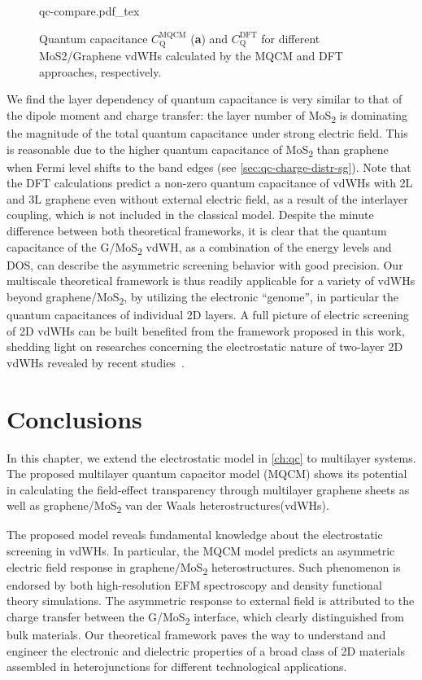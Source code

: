 \begin{figure}[!htbp]
  {qc-compare.pdf_tex}
  \caption{\label{fig:asym-qc} %
    Quantum capacitance $C_{\mathrm{Q}}^{\mathrm{MQCM}}$ (\textbf{a}) and $C_{\mathrm{Q}}^{\mathrm{DFT}}$ for different MoS2/Graphene
    vdWHs calculated by the MQCM and DFT approaches, respectively.
  }
\end{figure}
%
We find the layer dependency of quantum capacitance is very
similar to that of the dipole moment and charge transfer: the layer
number of MoS\textsubscript{2} is dominating the magnitude of the
total quantum capacitance under strong electric field. This is
reasonable due to the higher quantum capacitance of
MoS\textsubscript{2} than graphene when Fermi level shifts to the band
edges (see \autoref{sec:qc-charge-distr-sg}).
%
Note that the DFT calculations predict a non-zero quantum capacitance
of vdWHs with 2L and 3L graphene even without external electric field,
as a result of the interlayer coupling, which is not included in the
classical model. Despite the minute difference between both
theoretical frameworks, it is clear that the quantum capacitance of
the G/MoS\textsubscript{2} vdWH, as a combination of the energy levels
and DOS, can describe the asymmetric screening behavior with good
precision. Our multiscale theoretical framework is thus readily
applicable for a variety of vdWHs beyond
graphene/MoS\textsubscript{2}, by utilizing the electronic “genome”,
in particular the quantum capacitances of individual 2D layers. A full
picture of electric screening of 2D vdWHs can be built benefited from
the framework proposed in this work, shedding light on researches
concerning the electrostatic nature of two-layer 2D vdWHs revealed by
recent
studies~\autocite{Chu_2017_eh_tunneling,Lee_2014_pn_vdw_het,Furchi_2014_PV_vdwH}.

\section{Conclusions}
\label{sec:asym-conclusions}


In this chapter, we extend the electrostatic model in \autoref{ch:qc}
to multilayer systems. The proposed multilayer quantum capacitor model
(MQCM) shows its potential in calculating the field-effect
transparency through multilayer graphene sheets as well as
graphene/MoS\textsubscript{2} van der Waals heterostructures(vdWHs). 

The proposed model reveals fundamental knowledge about the
electrostatic screening in vdWHs.
In particular, the MQCM model predicts an
asymmetric electric field response in
graphene/MoS\textsubscript{2} heterostructures. Such phenomenon is endorsed by
both high-resolution EFM spectroscopy
and density functional theory simulations.
%
The asymmetric response to external field is attributed to the charge transfer between the G/MoS\textsubscript{2} interface, which clearly distinguished from bulk materials.
%
Our theoretical framework paves the way to
understand and engineer the electronic and dielectric properties of a
broad class of 2D materials assembled in heterojunctions for different
technological applications.

